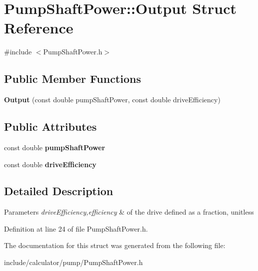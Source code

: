 \hypertarget{struct_pump_shaft_power_1_1_output}{}\section{Pump\+Shaft\+Power\+:\+:Output Struct Reference}
\label{struct_pump_shaft_power_1_1_output}


{\ttfamily \#include $<$Pump\+Shaft\+Power.\+h$>$}

\subsection*{Public Member Functions}
\begin{DoxyCompactItemize}
\item 
\mbox{\label{struct_pump_shaft_power_1_1_output_a8ff61548debb80f74496b486f77c4e5e}} 
{\bfseries Output} (const double pump\+Shaft\+Power, const double drive\+Efficiency)
\end{DoxyCompactItemize}
\subsection*{Public Attributes}
\begin{DoxyCompactItemize}
\item 
\mbox{\label{struct_pump_shaft_power_1_1_output_ac3f600a571d7c93bb67f84af7caad406}} 
const double {\bfseries pump\+Shaft\+Power}
\item 
\mbox{\label{struct_pump_shaft_power_1_1_output_aaccecb0ddeb130b91bf6bf33e32f17fd}} 
const double {\bfseries drive\+Efficiency}
\end{DoxyCompactItemize}


\subsection{Detailed Description}

\begin{DoxyParams}{Parameters}
{\em drive\+Efficiency,efficiency} & of the drive defined as a fraction, unitless \\
\hline
\end{DoxyParams}


Definition at line 24 of file Pump\+Shaft\+Power.\+h.



The documentation for this struct was generated from the following file\+:\begin{DoxyCompactItemize}
\item 
include/calculator/pump/Pump\+Shaft\+Power.\+h\end{DoxyCompactItemize}
